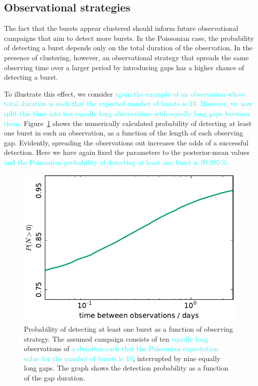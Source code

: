 \documentclass[fleqn,usenatbib]{mnras}
\newcommand{\new}[1]{\textcolor{cyan}{#1}}
\begin{document}
\subsection{Observational strategies}
\label{sec:obs_strategies}

The fact that the bursts appear clustered should inform future observational campaigns that aim to detect more bursts. In the Poissonian case, the probability of detecting a burst depends only on the total duration of the observation. In the presence of clustering, however, an observational strategy that spreads the same observing time over a larger period by introducing gaps has a higher chance of detecting a burst.

To illustrate this effect, we consider \new{again the example of an observation whose total duration is such that the expected number of bursts is 10. However, we now split this time into ten equally long observations with equally long gaps between them.} Figure~\ref{fig:obs_strategy} shows the numerically calculated probability of detecting at least one burst in such an observation, as a function of the length of each observing gap. Evidently, spreading the observations out increases the odds of a successful detection. Here we have again fixed the parameters to the posterior-mean values \new{and the Poissonian probability of detecting at least one burst is 99.995\,\%.}

\begin{figure}
	\includegraphics[width=1.0\columnwidth]{obs_strategy.pdf}
	\caption{\label{fig:obs_strategy}Probability of detecting at least one burst as a function of observing strategy. The assumed campaign consists of ten \new{equally long} observations of \new{a duration such that the Poissonian expectation value for the number of bursts is 10}, interrupted by nine equally long gaps. The graph shows the detection probability as a function of the gap duration.}
\end{figure}
\end{document}
